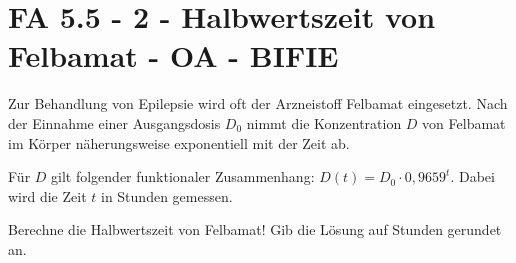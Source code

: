\section{FA 5.5 - 2 - Halbwertszeit von Felbamat - OA - BIFIE}

\begin{beispiel}[FA 5.5]{1} %
Zur Behandlung von Epilepsie wird oft der Arzneistoff Felbamat eingesetzt. Nach der Einnahme einer Ausgangsdosis $D_0$ nimmt die Konzentration $D$ von Felbamat im Körper näherungsweise exponentiell mit der Zeit ab. \leer

Für $D$ gilt folgender funktionaler Zusammenhang: $D(t) = D_0 \cdot 0,9659^t$.
Dabei wird die Zeit $t$ in Stunden gemessen. 

\leer

Berechne die Halbwertszeit von Felbamat! Gib die Lösung auf Stunden gerundet an.

\leer

\end{beispiel}